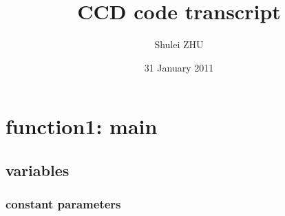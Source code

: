 \documentclass[11pt]{article}
\title{CCD code transcript}
\author{Shulei ZHU}
\date{31 January 2011}
\begin{document}
\maketitle

\setcounter{tocdepth}{2}
\tableofcontents
\vspace*{1cm}


\section{function1: main}
\label{sec-1}
\subsection{variables}
\label{sec-1_1}
\subsubsection{constant parameters}
\label{sec-1_1_1}
\end{document}
